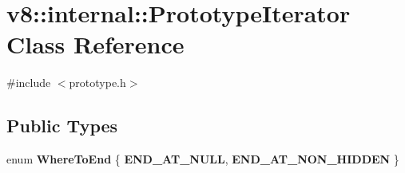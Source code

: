 \hypertarget{classv8_1_1internal_1_1PrototypeIterator}{}\section{v8\+:\+:internal\+:\+:Prototype\+Iterator Class Reference}
\label{classv8_1_1internal_1_1PrototypeIterator}


{\ttfamily \#include $<$prototype.\+h$>$}

\subsection*{Public Types}
\begin{DoxyCompactItemize}
\item 
\mbox{\label{classv8_1_1internal_1_1PrototypeIterator_a56b39f100d48581d82bcbd824e9e6b34}} 
enum {\bfseries Where\+To\+End} \{ {\bfseries E\+N\+D\+\_\+\+A\+T\+\_\+\+N\+U\+LL}, 
{\bfseries E\+N\+D\+\_\+\+A\+T\+\_\+\+N\+O\+N\+\_\+\+H\+I\+D\+D\+EN}
 \}
\end{DoxyCompactItemize}
